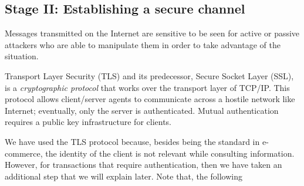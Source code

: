 

\subsection{Stage II: Establishing a secure channel}
\label{sec:secureChannel}
Messages transmitted on the Internet are sensitive to be seen for
active or passive attackers who are able to manipulate them in order
to take advantage of the situation.

Transport Layer Security (TLS) and its predecessor, Secure Socket
Layer (SSL), is a \emph{cryptographic protocol} that works over the transport 
layer of TCP/IP. This protocol allows client/server agents to communicate 
across a hostile network like Internet; eventually, only the server is authenticated. 
Mutual authentication requires a public key infrastructure for clients. 

We have used the TLS protocol because, besides being the 
standard in e-commerce, the identity of the client is not
relevant while consulting information. However, for transactions that 
require authentication, then we have taken an additional step that we will 
explain later. Note that, the following   

